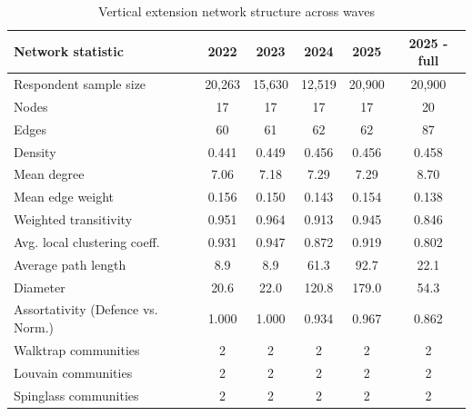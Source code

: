 \begin{table}[t]
\caption*{
{\fontsize{20}{25}\selectfont  Vertical extension network structure across waves\fontsize{10}{12}\selectfont }
} 
\fontsize{10.0pt}{12.0pt}\selectfont
\begin{tabular*}{\linewidth}{@{\extracolsep{\fill}}lccccc}
\toprule
{\bfseries Network statistic} & {\bfseries 2022} & {\bfseries 2023} & {\bfseries 2024} & {\bfseries 2025} & {\bfseries 2025 - full} \\ 
\midrule\addlinespace[2.5pt]
Respondent sample size & 20,263 & 15,630 & 12,519 & 20,900 & 20,900 \\ 
Nodes & 17 & 17 & 17 & 17 & 20 \\ 
Edges & 60 & 61 & 62 & 62 & 87 \\ 
Density & 0.441 & 0.449 & 0.456 & 0.456 & 0.458 \\ 
Mean degree & 7.06 & 7.18 & 7.29 & 7.29 & 8.70 \\ 
Mean edge weight & 0.156 & 0.150 & 0.143 & 0.154 & 0.138 \\ 
Weighted transitivity & 0.951 & 0.964 & 0.913 & 0.945 & 0.846 \\ 
Avg. local clustering coeff. & 0.931 & 0.947 & 0.872 & 0.919 & 0.802 \\ 
Average path length & 8.9 & 8.9 & 61.3 & 92.7 & 22.1 \\ 
Diameter & 20.6 & 22.0 & 120.8 & 179.0 & 54.3 \\ 
Assortativity (Defence vs. Norm.) & 1.000 & 1.000 & 0.934 & 0.967 & 0.862 \\ 
Walktrap communities & 2 & 2 & 2 & 2 & 2 \\ 
Louvain communities & 2 & 2 & 2 & 2 & 2 \\ 
Spinglass communities & 2 & 2 & 2 & 2 & 2 \\ 
\bottomrule
\end{tabular*}
\end{table}

